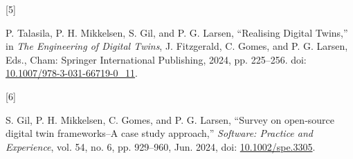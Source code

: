 \documentclass[
  12pt,
  a4paper,
]{article}
\newlength{\cslhangindent}
\newlength{\csllabelwidth}
\newenvironment{CSLReferences}[2] %
 {\begin{list}{}{%
  \setlength{\itemindent}{0pt}
  \setlength{\leftmargin}{0pt}
  \setlength{\parsep}{0pt}
  \ifodd #1
   \setlength{\leftmargin}{\cslhangindent}
   \setlength{\itemindent}{-1\cslhangindent}
  \fi
  \setlength{\itemsep}{#2\baselineskip}}}
 {\end{list}}
\newcommand{\CSLLeftMargin}[1]{\parbox[t]{\csllabelwidth}{\strut#1\strut}}
\newcommand{\CSLRightInline}[1]{\parbox[t]{\linewidth - \csllabelwidth}{\strut#1\strut}}
\begin{document}
\begin{CSLReferences}{0}{0}
\CSLLeftMargin{{[}5{]} }%
\CSLRightInline{P. Talasila, P. H. Mikkelsen, S. Gil, and P. G. Larsen,
{``Realising {Digital} {Twins},''} in \emph{The {Engineering} of
{Digital} {Twins}}, J. Fitzgerald, C. Gomes, and P. G. Larsen, Eds.,
Cham: Springer International Publishing, 2024, pp. 225--256. doi:
\href{https://doi.org/10.1007/978-3-031-66719-0_11}{10.1007/978-3-031-66719-0\_11}.}

\CSLLeftMargin{{[}6{]} }%
\CSLRightInline{S. Gil, P. H. Mikkelsen, C. Gomes, and P. G. Larsen,
{``Survey on open‐source digital twin frameworks--{A} case study
approach,''} \emph{Software: Practice and Experience}, vol. 54, no. 6,
pp. 929--960, Jun. 2024, doi:
\href{https://doi.org/10.1002/spe.3305}{10.1002/spe.3305}.}

\end{CSLReferences}
\end{document}
